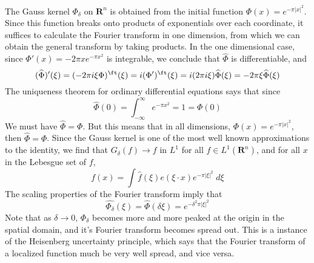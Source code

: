\begin{example}
	The Gauss kernel $\Phi_\delta$ on $\mathbf{R}^n$ is obtained from the initial function $\Phi(x) = e^{-\pi |x|^2}$. Since this function breaks onto products of exponentials over each coordinate, it suffices to calculate the Fourier transform in one dimension, from which we can obtain the general transform by taking products. In the one dimensional case, since $\Phi'(x) = -2 \pi x e^{- \pi x^2}$ is integrable, we conclude that $\widehat{\Phi}$ is differentiable, and
	\[ (\widehat{\Phi})'(\xi) = (- 2 \pi i \xi \Phi)^\ft(\xi) = i (\Phi')^\ft(\xi) = i (2 \pi i \xi) \widehat{\Phi}(\xi) = - 2 \pi \xi \widehat{\Phi}(\xi) \]
	The uniqueness theorem for ordinary differential equations says that since
	\[ \widehat{\Phi}(0) = \int_{-\infty}^\infty e^{- \pi x^2} = 1 = \Phi(0) \]
	We must have $\widehat{\Phi} = \Phi$. But this means that in all dimensions, $\Phi(x) = e^{- \pi |x|^2}$, then $\widehat{\Phi} = \Phi$. Since the Gauss kernel is one of the most well known approximations to the identity, we find that $G_\delta(f) \to f$ in $L^1$ for all $f \in L^1(\mathbf{R}^n)$, and for all $x$ in the Lebesgue set of $f$,
	\[ f(x) = \int \widehat{f}(\xi) e(\xi \cdot x) e^{- \pi |\xi|^2}\; d\xi \]
	The scaling properties of the Fourier transform imply that
	\[ \widehat{\Phi_\delta}(\xi) = \widehat{\Phi}(\delta \xi) = e^{- \delta^2 \pi |\xi|^2} \]
	Note that as $\delta \to 0$, $\Phi_\delta$ becomes more and more peaked at the origin in the spatial domain, and it's Fourier transform becomes spread out. This is a instance of the Heisenberg uncertainty principle, which says that the Fourier transform of a localized function much be very well spread, and vice versa.
\end{example}

